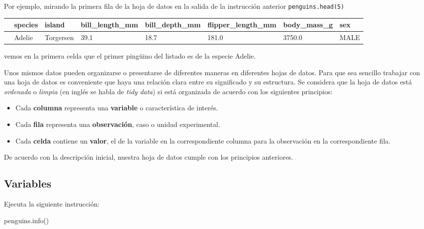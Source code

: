 \documentclass[
  a4paper,
  noprof,
  12pt,
  notoc,
  nosols,
  nobib]{mnye}
\newenvironment{Shaded}{\begin{snugshade}}{\end{snugshade}}
\newcommand{\NormalTok}[1]{\textcolor[rgb]{0.00,0.23,0.31}{#1}}
\providecommand{\tightlist}{%
  \setlength{\itemsep}{0pt}\setlength{\parskip}{0pt}}\usepackage{longtable,booktabs,array}
\theoremstyle{definition}
\theoremstyle{remark}
\begin{document}
Por ejemplo, mirando la primera fila de la hoja de datos en la salida de
la instrucción anterior \texttt{penguins.head(5)}

\begin{longtable}[]{@{}llllllll@{}}
\toprule\noalign{}
& species & island & bill\_length\_mm & bill\_depth\_mm &
flipper\_length\_mm & body\_mass\_g & sex \\
\midrule\noalign{}
\endhead
\bottomrule\noalign{}
\endlastfoot
0 & Adelie & Torgersen & 39.1 & 18.7 & 181.0 & 3750.0 & MALE \\
\end{longtable}

vemos en la primera celda que el primer pingüino del listado es de la
especie Adelie.

Unos mismos datos pueden organizarse o presentarse de diferentes maneras
en diferentes hojas de datos. Para que sea sencillo trabajar con una
hoja de datos es conveniente que haya una relación clara entre su
significado y su estructura. Se considera que la hoja de datos está
\emph{ordenada} o \emph{limpia} (en inglés se habla de \emph{tidy data})
si está organizada de acuerdo con los siguientes principios:

\begin{itemize}
\tightlist
\item
  Cada \textbf{columna} representa una \textbf{variable} o
  característica de interés.
\item
  Cada \textbf{fila} representa una \textbf{observación}, caso o unidad
  experimental.
\item
  Cada \textbf{celda} contiene un \textbf{valor}, el de la variable en
  la correspondiente columna para la observación en la correspondiente
  fila.
\end{itemize}

De acuerdo con la descripción inicial, nuestra hoja de datos cumple con
los principios anteriores.

\subsection{Variables}\label{variables}

Ejecuta la siguiente instrucción:

\begin{Shaded}
\begin{Highlighting}[]
\NormalTok{penguins.info()}
\end{Highlighting}
\end{Shaded}
\end{document}

